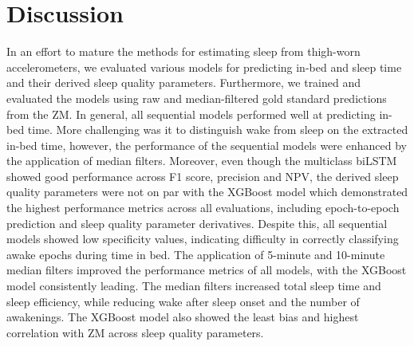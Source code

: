 \documentclass[
  super,
  preprint,
  3p]{elsarticle}
\begin{document}
\hypertarget{discussion}{%
\section{Discussion}\label{discussion}}

In an effort to mature the methods for estimating sleep from thigh-worn
accelerometers, we evaluated various models for predicting in-bed and
sleep time and their derived sleep quality parameters. Furthermore, we
trained and evaluated the models using raw and median-filtered gold
standard predictions from the ZM. In general, all sequential models
performed well at predicting in-bed time. More challenging was it to
distinguish wake from sleep on the extracted in-bed time, however, the
performance of the sequential models were enhanced by the application of
median filters. Moreover, even though the multiclass biLSTM showed good
performance across F1 score, precision and NPV, the derived sleep
quality parameters were not on par with the XGBoost model which
demonstrated the highest performance metrics across all evaluations,
including epoch-to-epoch prediction and sleep quality parameter
derivatives. Despite this, all sequential models showed low specificity
values, indicating difficulty in correctly classifying awake epochs
during time in bed. The application of 5-minute and 10-minute median
filters improved the performance metrics of all models, with the XGBoost
model consistently leading. The median filters increased total sleep
time and sleep efficiency, while reducing wake after sleep onset and the
number of awakenings. The XGBoost model also showed the least bias and
highest correlation with ZM across sleep quality parameters.
\end{document}
